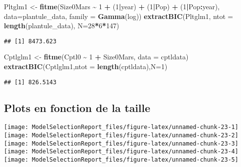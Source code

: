 \documentclass[
]{article}
\newenvironment{Shaded}{\begin{snugshade}}{\end{snugshade}}
\newcommand{\AttributeTok}[1]{\textcolor[rgb]{0.13,0.29,0.53}{#1}}
\newcommand{\DecValTok}[1]{\textcolor[rgb]{0.00,0.00,0.81}{#1}}
\newcommand{\FunctionTok}[1]{\textcolor[rgb]{0.13,0.29,0.53}{\textbf{#1}}}
\newcommand{\NormalTok}[1]{#1}
\newcommand{\OtherTok}[1]{\textcolor[rgb]{0.56,0.35,0.01}{#1}}
\newcommand{\SpecialCharTok}[1]{\textcolor[rgb]{0.81,0.36,0.00}{\textbf{#1}}}
\begin{document}
\begin{Shaded}
\begin{Highlighting}[]
\NormalTok{Pltglm1 }\OtherTok{\textless{}{-}} \FunctionTok{fitme}\NormalTok{(Size0Mars }\SpecialCharTok{\textasciitilde{}} \DecValTok{1} \SpecialCharTok{+}\NormalTok{ (}\DecValTok{1}\SpecialCharTok{|}\NormalTok{year) }\SpecialCharTok{+}\NormalTok{ (}\DecValTok{1}\SpecialCharTok{|}\NormalTok{Pop) }\SpecialCharTok{+}\NormalTok{ (}\DecValTok{1}\SpecialCharTok{|}\NormalTok{Pop}\SpecialCharTok{:}\NormalTok{year),}
                 \AttributeTok{data=}\NormalTok{plantule\_data,}
                 \AttributeTok{family =} \FunctionTok{Gamma}\NormalTok{(log))}
\FunctionTok{extractBIC}\NormalTok{(Pltglm1, }\AttributeTok{ntot =} \FunctionTok{length}\NormalTok{(plantule\_data), }\AttributeTok{N=}\DecValTok{28}\SpecialCharTok{*}\DecValTok{6}\SpecialCharTok{*}\DecValTok{147}\NormalTok{)}
\end{Highlighting}
\end{Shaded}

\begin{verbatim}
## [1] 8473.623
\end{verbatim}

\begin{Shaded}
\begin{Highlighting}[]
\NormalTok{Cptlglm1 }\OtherTok{\textless{}{-}} \FunctionTok{fitme}\NormalTok{(Cptl0 }\SpecialCharTok{\textasciitilde{}} \DecValTok{1} \SpecialCharTok{+}\NormalTok{ Size0Mars,}
                  \AttributeTok{data =}\NormalTok{ cptldata)}
\FunctionTok{extractBIC}\NormalTok{(Cptlglm1,}\AttributeTok{ntot =} \FunctionTok{length}\NormalTok{(cptldata),}\AttributeTok{N=}\DecValTok{1}\NormalTok{)}
\end{Highlighting}
\end{Shaded}

\begin{verbatim}
## [1] 826.5143
\end{verbatim}

\subsection{Plots en fonction de la
taille}\label{plots-en-fonction-de-la-taille-1}

\texttt{[image: ModelSelectionReport\_files/figure-latex/unnamed-chunk-23-1]}
\texttt{[image: ModelSelectionReport\_files/figure-latex/unnamed-chunk-23-2]}
\texttt{[image: ModelSelectionReport\_files/figure-latex/unnamed-chunk-23-3]}
\texttt{[image: ModelSelectionReport\_files/figure-latex/unnamed-chunk-23-4]}
\texttt{[image: ModelSelectionReport\_files/figure-latex/unnamed-chunk-23-5]}
\end{document}
